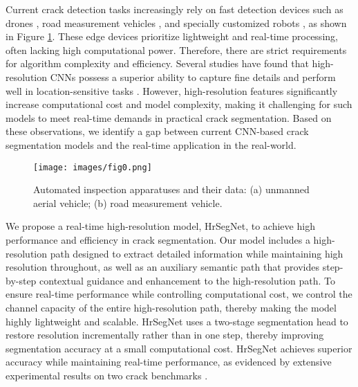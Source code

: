 \documentclass[preprint,12pt,authoryear]{elsarticle}
\begin{document}
Current crack detection tasks increasingly rely on fast detection devices such as drones \citep{ding_crack_2023}, road measurement vehicles \citep{guo_pavement_2023}, and specially customized robots \citep{kouzehgar2019self}, as shown in Figure \ref{fig:fig0}. These edge devices prioritize lightweight and real-time processing, often lacking high computational power. Therefore, there are strict requirements for algorithm complexity and efficiency. Several studies have found that high-resolution CNNs possess a superior ability to capture fine details and perform well in location-sensitive tasks \citep{wang_deep_2020, xu_pixel-level_2021, wang_u-hrnet_2022, jia_efficient_2022, zhang_recurrent_2022}. However, high-resolution features significantly increase computational cost and model complexity, making it challenging for such models to meet real-time demands in practical crack segmentation. Based on these observations, we identify a gap between current CNN-based crack segmentation models and the real-time application in the real-world.

\begin{figure}[t]
    \centering
    \texttt{[image: images/fig0.png]}
    \caption{Automated inspection apparatuses and their data: (a) unmanned aerial vehicle; (b) road measurement vehicle.}
    \label{fig:fig0}
\end{figure}

We propose a real-time high-resolution model, HrSegNet, to achieve high performance and efficiency in crack segmentation. Our model includes a high-resolution path designed to extract detailed information while maintaining high resolution throughout, as well as an auxiliary semantic path that provides step-by-step contextual guidance and enhancement to the high-resolution path. To ensure real-time performance while controlling computational cost, we control the channel capacity of the entire high-resolution path, thereby making the model highly lightweight and scalable. HrSegNet uses a two-stage segmentation head to restore resolution incrementally rather than in one step, thereby improving segmentation accuracy at a small computational cost. HrSegNet achieves superior accuracy while maintaining real-time performance, as evidenced by extensive experimental results on two crack benchmarks \citep{benz_crack_2019, kulkarni_crackseg9k_2022}. 
\end{document}
